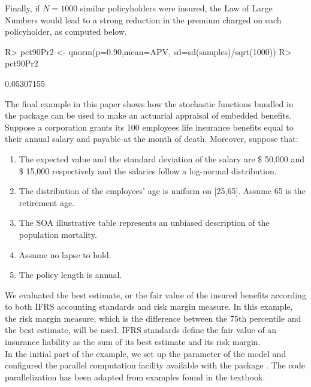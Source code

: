 \documentclass[nojss]{jss}
\begin{document}
Finally, if $N=1000$ similar policyholders were insured, the Law of Large
Numbers would lead to a strong reduction in the premium charged on each
policyholder, as computed below.

\begin{Schunk}
\begin{Sinput}
R> pct90Pr2 <- qnorm(p=0.90,mean=APV, sd=sd(samples)/sqrt(1000))
R> pct90Pr2
\end{Sinput}
\begin{Soutput}
[1] 0.05307155
\end{Soutput}
\end{Schunk}


The final example in this paper shows how the stochastic functions bundled in
the  package can be used to make an actuarial appraisal of embedded benefits.\\
Suppose a corporation grants its 100 employees life insurance benefits equal to
their annual salary and payable at the month of death. Moreover, suppose that:
\begin{enumerate}
	\item The expected value and the standard deviation of the salary are \$ 50,000 and \$ 15,000 respectively and the 
	salaries follow a log-normal distribution.
	\item The distribution of the employees' age  is uniform on [25,65]. Assume 65 is the retirement age.
	\item The SOA illustrative table represents an unbiased description of the
	population mortality.
	\item Assume no lapse to hold.
	\item The policy length is annual.
\end{enumerate}

We evaluated the best estimate, or the fair value of the insured benefits according 
to both IFRS accounting standards and risk
margin measure. In this example, the risk margin measure, which is the difference between the 75th percentile and the best estimate, will be used. IFRS
standards \citep{ifrsInsurance} define the fair value of an insurance liability as the sum of its best estimate and its risk margin.\\

In the initial part of the example, we set up the parameter of the model and configured the parallel computation facility available with the package . The code parallelization has been adapted from examples found in the \citep{mccallum2011parallel} textbook.
\end{document}
